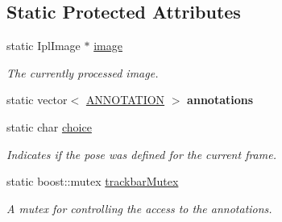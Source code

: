 \subsection*{Static Protected Attributes}
\begin{DoxyCompactItemize}
\item 
static IplImage $\ast$ \hyperlink{classannotationsHandle_a42cb5f5737262947250c709931232c69}{image}
\begin{DoxyCompactList}\small\item\em The currently processed image. \item\end{DoxyCompactList}\item 
\hypertarget{classannotationsHandle_ae9fe3ed8c2d988da74227e53bf6ba766}{
static vector$<$ \hyperlink{structannotationsHandle_1_1ANNOTATION}{ANNOTATION} $>$ {\bfseries annotations}}
\label{classannotationsHandle_ae9fe3ed8c2d988da74227e53bf6ba766}

\item 
\hypertarget{classannotationsHandle_afd05e88e13762e173d9d20fe3596216f}{
static char \hyperlink{classannotationsHandle_afd05e88e13762e173d9d20fe3596216f}{choice}}
\label{classannotationsHandle_afd05e88e13762e173d9d20fe3596216f}

\begin{DoxyCompactList}\small\item\em Indicates if the pose was defined for the current frame. \item\end{DoxyCompactList}\item 
\hypertarget{classannotationsHandle_a13d528766773c38917d47141e6b36252}{
static boost::mutex \hyperlink{classannotationsHandle_a13d528766773c38917d47141e6b36252}{trackbarMutex}}
\label{classannotationsHandle_a13d528766773c38917d47141e6b36252}

\begin{DoxyCompactList}\small\item\em A mutex for controlling the access to the annotations. \item\end{DoxyCompactList}\end{DoxyCompactItemize}


